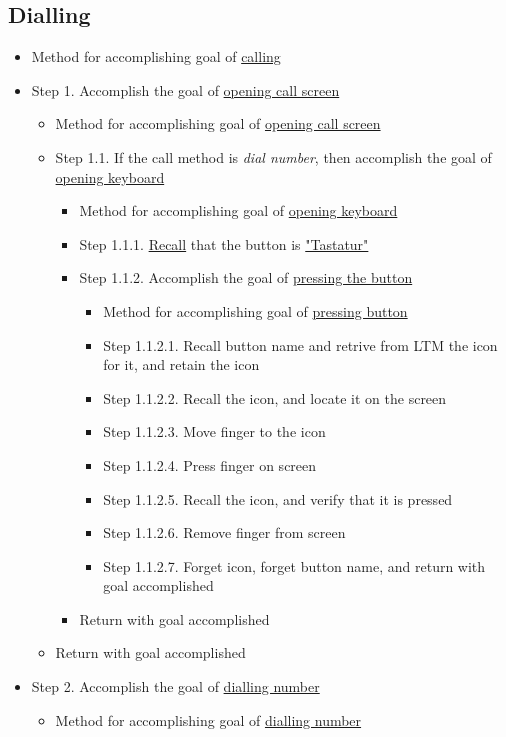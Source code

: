 \documentclass{article}
\begin{document}
\subsection*{Dialling}
\begin{itemize}
	\item Method for accomplishing goal of \uline{calling}
	\item Step 1. Accomplish the goal of \uline{opening call screen}
		\begin{itemize}
			\item Method for accomplishing goal of \uline{opening call screen}
			\item Step 1.1. If the call method is \textit{dial number}, then accomplish the goal of \uline{opening keyboard}
			\begin{itemize}
				\item Method for accomplishing goal of \uline{opening keyboard}
				\item Step 1.1.1. \uline{Recall} that the button is \uline{"Tastatur"}
				\item Step 1.1.2. Accomplish the goal of \uline{pressing the button}
				\begin{itemize}
					\item Method for accomplishing goal of \uline{pressing button}
					\item Step 1.1.2.1. Recall button name and retrive from LTM the icon for it, and retain the icon
					\item Step 1.1.2.2. Recall the icon, and locate it on the screen
					\item Step 1.1.2.3. Move finger to the icon
					\item Step 1.1.2.4. Press finger on screen
					\item Step 1.1.2.5. Recall the icon, and verify that it is pressed
					\item Step 1.1.2.6. Remove finger from screen
					\item Step 1.1.2.7. Forget icon, forget button name, and return with goal accomplished
				\end{itemize}
    				\item Return with goal accomplished
			\end{itemize}
    			\item Return with goal accomplished
		\end{itemize}
	\item Step 2. Accomplish the goal of \uline{dialling number}
		\begin{itemize}
    			\item Method for accomplishing goal of \uline{dialling number}

\end{itemize}
\end{itemize}
\end{document}
